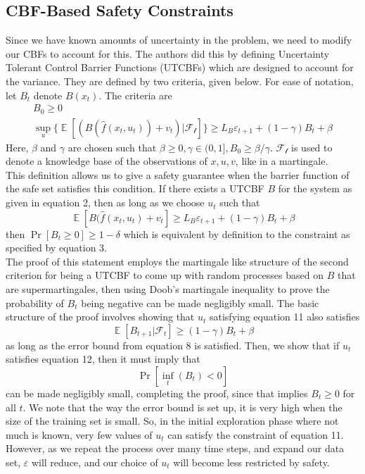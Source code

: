 \documentclass{article}
\newcommand{\eps}{\varepsilon}
\DeclareMathOperator*{\E}{\mathbb{E}}
\begin{document}
\subsection{CBF-Based Safety Constraints} 
Since we have known amounts of uncertainty in the problem, we need to modify our CBFs to account for this. The authors did this by defining Uncertainty Tolerant Control Barrier Functions (UTCBFs) which are designed to account for the variance. They are defined by two criteria, given below. For ease of notation, let $B_t$ denote $B(x_t)$. The criteria are \begin{align}
    B_0 \geq 0 \\
    \sup_u\{ \E[(B(\hat{f}(x_t, u_t)) + v_t)|\mathcal{F_t}]\} \geq L_B\eps_{t + 1} + (1 - \gamma)B_t + \beta
\end{align}
Here, $\beta$ and $\gamma$ are chosen such that $\beta \geq 0, \gamma \in (0, 1], B_0 \geq \beta/\gamma$. $\mathcal{F_t}$ is used to denote a knowledge base of the observations of $x, u, v$, like in a martingale. \\
This definition allows us to give a safety guarantee when the barrier function of the safe set satisfies this condition. If there exists a UTCBF $B$ for the system as given in equation 2, then as long as we choose $u_t$ such that \begin{equation}
    \E[B(\hat{f}(x_t, u_t) + v_t] \geq L_B\eps_{t + 1} + (1 - \gamma)B_t + \beta
\end{equation} then $\Pr[B_t \geq 0] \geq 1 - \delta$ which is equivalent by definition to the constraint as specified by equation 3. \\
The proof of this statement employs the martingale like structure of the second criterion for being a UTCBF to come up with random processes based on $B$ that are supermartingales, then using Doob's martingale inequality to prove the probability of $B_t$ being negative can be made negligibly small. The basic structure of the proof involves showing that $u_t$ satisfying equation 11 also satisfies \begin{equation}
    \E[B_{t + 1}|\mathcal{F}_t] \geq (1 - \gamma)B_t + \beta
\end{equation} as long as the error bound from equation 8 is satisfied. Then, we show that if $u_t$ satisfies equation 12, then it must imply that \[\Pr[\inf_t(B_t) < 0]\] can be made negligibly small, completing the proof, since that implies $B_t \geq 0$ for all $t$. We note that the way the error bound is set up, it is very high when the size of the training set is small. So, in the initial exploration phase where not much is known, very few values of $u_t$ can satisfy the constraint of equation 11. However, as we repeat the process over many time steps, and expand our data set, $\eps$ will reduce, and our choice of $u_t$ will become less restricted by safety.
\end{document}
